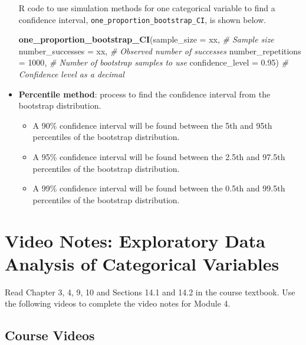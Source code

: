 \documentclass[
]{report}
\newenvironment{Shaded}{\begin{snugshade}}{\end{snugshade}}
\newcommand{\AttributeTok}[1]{\textcolor[rgb]{0.13,0.29,0.53}{#1}}
\newcommand{\CommentTok}[1]{\textcolor[rgb]{0.56,0.35,0.01}{\textit{#1}}}
\newcommand{\DecValTok}[1]{\textcolor[rgb]{0.00,0.00,0.81}{#1}}
\newcommand{\FloatTok}[1]{\textcolor[rgb]{0.00,0.00,0.81}{#1}}
\newcommand{\FunctionTok}[1]{\textcolor[rgb]{0.13,0.29,0.53}{\textbf{#1}}}
\newcommand{\NormalTok}[1]{#1}
\begin{document}
\begin{itemize}
  R code to use simulation methods for one categorical variable to find a confidence interval, \texttt{one\_proportion\_bootstrap\_CI}, is shown below.

\begin{Shaded}
\begin{Highlighting}[]
\FunctionTok{one\_proportion\_bootstrap\_CI}\NormalTok{(}\AttributeTok{sample\_size =}\NormalTok{ xx, }\CommentTok{\# Sample size}
                \AttributeTok{number\_successes =}\NormalTok{ xx, }\CommentTok{\# Observed number of successes}
                \AttributeTok{number\_repetitions =} \DecValTok{1000}\NormalTok{, }\CommentTok{\# Number of bootstrap samples to use}
                \AttributeTok{confidence\_level =} \FloatTok{0.95}\NormalTok{) }\CommentTok{\# Confidence level as a decimal}
\end{Highlighting}
\end{Shaded}
\item
  \textbf{Percentile method}: process to find the confidence interval from the bootstrap distribution.

  \begin{itemize}
  \item
    A 90\% confidence interval will be found between the 5th and 95th percentiles of the bootstrap distribution.
  \item
    A 95\% confidence interval will be found between the 2.5th and 97.5th percentiles of the bootstrap distribution.
  \item
    A 99\% confidence interval will be found between the 0.5th and 99.5th percentiles of the bootstrap distribution.
  \end{itemize}
\end{itemize}

\newpage

\section{Video Notes: Exploratory Data Analysis of Categorical Variables}\label{video-notes-exploratory-data-analysis-of-categorical-variables}

Read Chapter 3, 4, 9, 10 and Sections 14.1 and 14.2 in the course textbook. Use the following videos to complete the video notes for Module 4.

\subsection{Course Videos}\label{course-videos-2}
\end{document}
